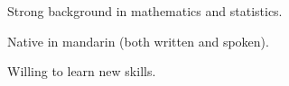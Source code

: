 

\begin{cventries}

  \cventry
    {} %
    {} %
    {} %
    {} %
    {
      \begin{cvitems} %
      \item Strong background in mathematics and statistics.
      \item Native in mandarin (both written and spoken).
      \item Willing to learn new skills.
      \end{cvitems}
    }


\end{cventries}
